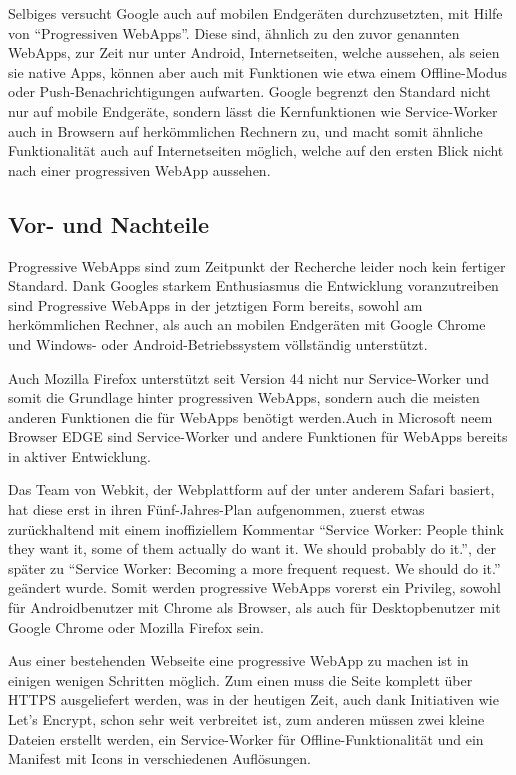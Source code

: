 \documentclass[a4paper,12pt,ngerman,listof=numbered]{scrartcl}      %
\let\oldcite\cite
\renewcommand{\cite}[1]{\textsuperscript{\oldcite{#1}}}
\begin{document}
	Selbiges versucht Google auch auf mobilen Endgeräten durchzusetzten, mit Hilfe von ``Progressiven WebApps''. Diese sind, ähnlich zu den zuvor genannten WebApps, zur Zeit nur unter Android, Internetseiten, welche aussehen, als seien sie native Apps, können aber auch mit Funktionen wie etwa einem Offline-Modus oder Push-Be\-nach\-rich\-ti\-gungen aufwarten. Google begrenzt den Standard nicht nur auf mobile Endgeräte, sondern lässt die Kernfunktionen wie Service-Worker auch in Browsern auf herkömmlichen Rechnern zu, und macht somit ähnliche Funktionalität auch auf Internetseiten möglich, welche auf den ersten Blick nicht nach einer progressiven WebApp aussehen.\cite{prwebappWiki}\par
	
	\subsection{Vor- und Nachteile}
	Progressive WebApps sind zum Zeitpunkt der Recherche leider noch kein fertiger Standard. Dank Googles starkem Enthusiasmus die Entwicklung voranzutreiben sind Progressive WebApps in der jetztigen Form bereits, sowohl am herkömmlichen Rechner, als auch an mobilen Endgeräten mit Google Chrome und Windows- oder Android-Betriebssystem völlständig unterstützt.\par
	Auch Mozilla Firefox unterstützt seit Version 44 nicht nur Service-Worker und somit die Grundlage hinter progressiven WebApps, sondern auch die meisten anderen Funktionen die für WebApps benötigt werden.Auch in Microsoft neem Browser EDGE sind Service-Worker und andere Funktionen für WebApps bereits in aktiver Entwicklung.\cite{swReady}\par
	Das Team von Webkit, der Webplattform auf der unter anderem Safari basiert, hat diese erst in ihren Fünf-Jahres-Plan aufgenommen, zuerst etwas zurückhaltend mit einem inoffiziellem Kommentar ``Service Worker: People think they want it, some of them actually do want it. We should probably do it.''\cite{webkitServiceWorkerTwitter}, der später zu ``Service Worker: Becoming a more frequent request. We should do it.''\cite{webkitServiceWorker5yPlan} geändert wurde. Somit werden progressive WebApps vorerst ein Privileg, sowohl für Androidbenutzer mit Chrome als Browser, als auch für Desktopbenutzer mit Google Chrome oder Mozilla Firefox sein. \cite{telerikWebApp}\par
	Aus einer bestehenden Webseite eine progressive WebApp zu machen ist in einigen wenigen Schritten möglich. Zum einen muss die Seite komplett über \-HTTPS ausgeliefert werden, was in der heutigen Zeit, auch dank Initiativen wie Let's Encrypt, schon sehr weit verbreitet ist, zum anderen müssen zwei kleine Dateien erstellt werden, ein Service-Worker für Offline-Funktionalität und ein Manifest mit Icons in verschiedenen Auflösungen.\par
\end{document}
